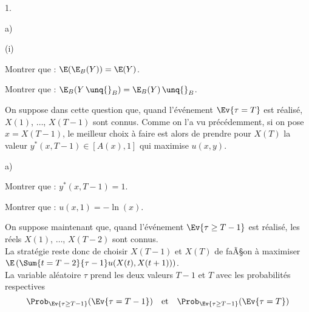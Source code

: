 \documentclass[11pt]{article}%
\begin{document}
\begin{noliste}{1.}
\begin{noliste}{a)}
\begin{nonoliste}{(i)}
      

      
      \item Montrer que : $\E(\E_B(Y)) = \E(Y)$.
      
      

      
      \item Montrer que : $\E_B(Y \, \unq{}_B) = \E_B(Y) \, \unq{}_B$.
      
      
    \end{nonoliste}
  \end{noliste}
    
  \item On suppose dans cette question que, quand l'événement $\Ev{\tau 
  =T}$ est réalisé, $X(1)$, $\ldots$, $X(T-1)$ sont connus. Comme on 
  l'a vu précédemment, si on pose $x=X(T-1)$, le meilleur choix à faire
  est alors de prendre pour $X(T)$ la valeur $y^*(x,T-1) \in [A(x),1]$
  qui maximise $u(x,y)$.
  \begin{noliste}{a)}
    \setlength{\itemsep}{2mm}
    \item Montrer que : $y^*(x,T-1)=1$.
    
    
    
    \item Montrer que : $u(x,1)=-\ln(x)$.
    
    
  \end{noliste}
  
  \item On suppose maintenant que, quand l'événement $\Ev{\tau \geq 
  T-1}$ est réalisé, les réels $X(1)$, $\ldots$, $X(T-2)$ sont connus. 
  \\[.1cm]
  La 
  stratégie reste donc de choisir $X(T-1)$ et $X(T)$ de faÃ§on à 
  maximiser $\E\left(\Sum{t=T-2}{\tau-1} u(X(t), 
  X(t+1))\right)$.\\[.1cm]
  La variable aléatoire $\tau$ prend les deux valeurs $T-1$ et $T$ 
  avec les probabilités respectives 
  \[
    \Prob_{\Ev{\tau \geq T-1}}(\Ev{\tau = T-1}) \quad \text{et} 
    \quad \Prob_{\Ev{\tau \geq T-1}}(\Ev{\tau = T})
  \]
  \end{noliste}
  
  
  
\end{document}
